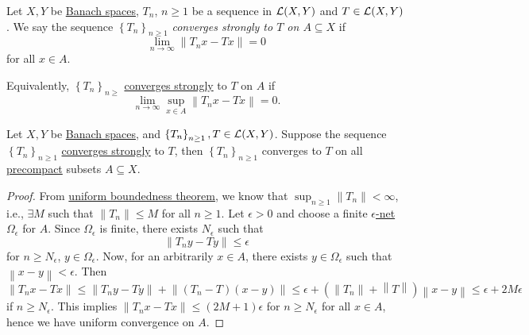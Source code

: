 \begin{definition}\label{def:strongly-convergence}
	Let \(X, Y\) be \hyperref[def:Banach-space]{Banach spaces}, \(T_n\), \(n \geq 1\) be a sequence in \(\mathcal{\MakeUppercase{l}} (X, Y)\) and \(T\in \mathcal{\MakeUppercase{l}} (X, Y)\). We say the sequence \(\left\{ T_n \right\} _{n \geq 1}\) \emph{converges strongly to \(T\) on \(A\subseteq X\)} if
	\[
		\lim_{n \to \infty} \left\lVert T_n x - Tx\right\rVert = 0
	\]
	for all \(x\in A\).
\end{definition}

Equivalently, \(\left\{ T_n \right\} _{n\geq }\) \hyperref[def:strongly-convergence]{converges strongly} to \(T\) on \(A\) if
\[
	\lim_{n \to \infty} \sup_{x\in A} \left\lVert T_n x - Tx\right\rVert = 0.
\]

\begin{lemma}\label{lma:lec16}
	Let \(X, Y\) be \hyperref[def:Banach-space]{Banach spaces}, and \(\left\{ T_n \right\} _{n \geq 1}, T\in \mathcal{\MakeUppercase{l}} (X, Y)\). Suppose the sequence \(\left\{ T_n \right\} _{n \geq 1}\) \hyperref[def:strongly-convergence]{converges strongly} to \(T\), then \(\left\{ T_n \right\}_{n \geq 1}\) converges to \(T\) on all \hyperref[def:precompact]{precompact} subsets \(A \subseteq X\).
\end{lemma}
\begin{proof}
	From \hyperref[thm:uniform-boundedness]{uniform boundedness theorem}, we know that \(\sup _{n \geq 1} \left\lVert T_n\right\rVert < \infty \), i.e., \(\exists M\) such that \(\left\lVert T_n\right\rVert \leq M\) for all \(n \geq 1\). Let \(\epsilon > 0\) and choose a finite \hyperref[def:eps-net]{\(\epsilon \)-net} \(\Omega _\epsilon \)  for \(A\). Since \(\Omega _{\epsilon }\) is finite, there exists \(N_{\epsilon } \) such that
	\[
		\left\lVert T_n y - Ty\right\rVert \leq \epsilon
	\]
	for \(n \geq N_{\epsilon } \), \(y\in \Omega _{\epsilon }\). Now, for an arbitrarily \(x\in A\), there exists \(y\in \Omega _\epsilon \) such that \(\left\lVert x - y\right\rVert < \epsilon \). Then
	\[
		\left\lVert T_n x - Tx\right\rVert \leq \left\lVert T_n y - T y\right\rVert + \left\lVert (T_n - T)(x - y)\right\rVert \leq \epsilon + \left( \left\lVert T_n\right\rVert + \left\lVert T\right\rVert  \right) \left\lVert x - y \right\rVert \leq \epsilon + 2M\epsilon
	\]
	if \(n \geq N_{\epsilon } \). This implies \(\left\lVert T_n x - Tx\right\rVert \leq (2M+1)\epsilon \) for \(n \geq N_{\epsilon } \) for all \(x\in A\), hence we have uniform convergence on \(A\).
\end{proof}

